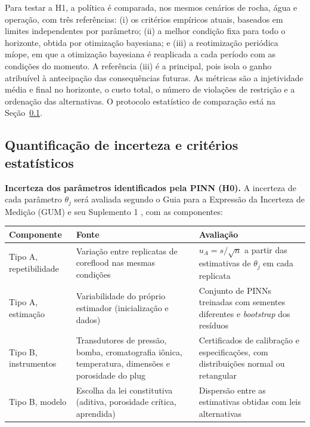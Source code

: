 \documentclass[11pt,a4paper]{article}
\begin{document}
Para testar a H1, a política é comparada, nos mesmos cenários de rocha, água e operação,
com três referências: (i) os critérios empíricos atuais, baseados em limites
independentes por parâmetro; (ii) a melhor condição fixa para todo o horizonte, obtida por
otimização bayesiana; e (iii) a reotimização periódica míope, em que a otimização
bayesiana é reaplicada a cada período com as condições do momento. A referência (iii) é a
principal, pois isola o ganho atribuível à antecipação das consequências futuras. As
métricas são a injetividade média e final no horizonte, o custo total, o número de
violações de restrição e a ordenação das alternativas. O protocolo estatístico de
comparação está na Seção~\ref{sec:incerteza}.

\subsection{Quantificação de incerteza e critérios estatísticos}\label{sec:incerteza}

\textbf{Incerteza dos parâmetros identificados pela PINN (H0).} A incerteza de cada
parâmetro $\theta_j$ será avaliada segundo o Guia para a Expressão da Incerteza de Medição
(GUM) \cite{gum2008} e seu Suplemento 1 \cite{gums12008}, com as componentes:

\begin{center}
\small
\begin{tabularx}{\textwidth}{@{}l>{\raggedright\arraybackslash}X>{\raggedright\arraybackslash}X@{}}
\toprule
\textbf{Componente} & \textbf{Fonte} & \textbf{Avaliação} \\
\midrule
Tipo A, repetibilidade & Variação entre replicatas de coreflood nas mesmas condições & $u_A = s/\sqrt{n}$ a partir das estimativas de $\theta_j$ em cada replicata \\
Tipo A, estimação & Variabilidade do próprio estimador (inicialização e dados) & Conjunto de PINNs treinadas com sementes diferentes \cite{lakshminarayanan2017} e \textit{bootstrap} dos resíduos \cite{efron1993} \\
Tipo B, instrumentos & Transdutores de pressão, bomba, cromatografia iônica, temperatura, dimensões e porosidade do plug & Certificados de calibração e especificações, com distribuições normal ou retangular \\
Tipo B, modelo & Escolha da lei constitutiva (aditiva, porosidade crítica, aprendida) & Dispersão entre as estimativas obtidas com leis alternativas \\
\bottomrule
\end{tabularx}
\end{center}
\end{document}

